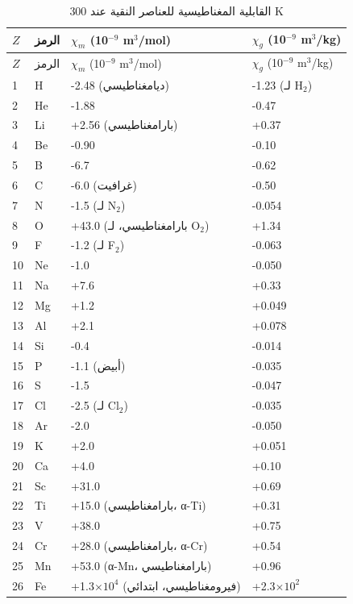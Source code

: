 \documentclass[11pt,a4paper]{article}
\begin{document}
\begin{otherlanguage}{arabic}
		\begin{longtable}{p{0.6cm}p{1.2cm}p{2.5cm}p{2.5cm}}
			\caption{القابلية المغناطيسية للعناصر النقية عند 300 K} \label{tab:magnetic-susceptibility-all} \\
			\toprule
			\(Z\) & الرمز & \(\chi_m\) (10\(^{-9}\) m\(^3\)/mol) & \(\chi_g\) (10\(^{-9}\) m\(^3\)/kg) \\
			\midrule
			\endfirsthead
			\toprule
			\(Z\) & الرمز & \(\chi_m\) (10\(^{-9}\) m\(^3\)/mol) & \(\chi_g\) (10\(^{-9}\) m\(^3\)/kg) \\
			\midrule
			\endhead
			1  & H  & -2.48 (ديامغناطيسي) & -1.23 (لـ H\(_2\)) \\
			2  & He & -1.88 & -0.47 \\
			3  & Li & +2.56 (بارامغناطيسي) & +0.37 \\
			4  & Be & -0.90 & -0.10 \\
			5  & B  & -6.7 & -0.62 \\
			6  & C  & -6.0 (غرافيت) & -0.50 \\
			7  & N  & -1.5 (لـ N\(_2\)) & -0.054 \\
			8  & O  & +43.0 (بارامغناطيسي، لـ O\(_2\)) & +1.34 \\
			9  & F  & -1.2 (لـ F\(_2\)) & -0.063 \\
			10 & Ne & -1.0 & -0.050 \\
			11 & Na & +7.6 & +0.33 \\
			12 & Mg & +1.2 & +0.049 \\
			13 & Al & +2.1 & +0.078 \\
			14 & Si & -0.4 & -0.014 \\
			15 & P  & -1.1 (أبيض) & -0.035 \\
			16 & S  & -1.5 & -0.047 \\
			17 & Cl & -2.5 (لـ Cl\(_2\)) & -0.035 \\
			18 & Ar & -2.0 & -0.050 \\
			19 & K  & +2.0 & +0.051 \\
			20 & Ca & +4.0 & +0.10 \\
			21 & Sc & +31.0 & +0.69 \\
			22 & Ti & +15.0 (بارامغناطيسي، α-Ti) & +0.31 \\
			23 & V  & +38.0 & +0.75 \\
			24 & Cr & +28.0 (بارامغناطيسي، α-Cr) & +0.54 \\
			25 & Mn & +53.0 (α-Mn، بارامغناطيسي) & +0.96 \\
			26 & Fe & +1.3\(\times10^4\) (فيرومغناطيسي، ابتدائي) & +2.3\(\times10^2\) \\

\end{longtable}
\end{otherlanguage}
\end{document}
